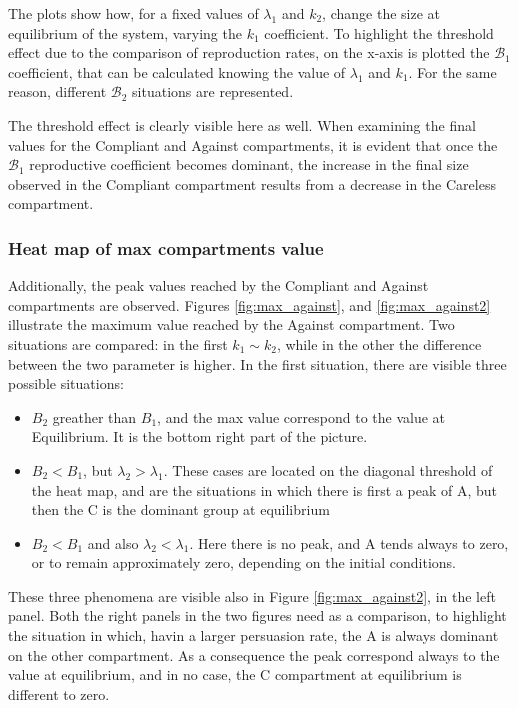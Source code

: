 The plots show how, for a fixed values of $\lambda_1$ and $k_2$, change the size at equilibrium of the system, varying the $k_1$ coefficient. To highlight the threshold effect due to the comparison of reproduction rates, on the x-axis is plotted the $\mathcal{B}_1$  coefficient, that can be calculated knowing the value of  $\lambda_1$ and $k_1$. For the same reason, different $\mathcal{B}_2$ situations are represented. 

The threshold effect is clearly visible here as well. When examining the final values for the Compliant and Against compartments, it is evident that once the $\mathcal{B}_1$ reproductive coefficient becomes dominant, the increase in the final size observed in the Compliant compartment results from a decrease in the Careless compartment.

\subsubsection{Heat map of max compartments value}
Additionally, the peak values reached by the Compliant and Against compartments are observed. Figures \ref{fig:max_against}, and \ref{fig:max_against2} illustrate the maximum value reached by the Against compartment.
Two situations are compared: in the first $k_1 \sim k_2$, while in the other the difference between the two parameter is higher. In the first situation, there are visible three possible situations:
\begin{itemize}
	\item $B_2 $ greather than $B_1$, and the max value correspond to the value at Equilibrium. It is the bottom right part of the picture.
	\item $B_2 < B_1$, but $\lambda_2 > \lambda_1$. These cases are located on the diagonal threshold of the heat map, and are the situations in which there is first a peak of A, but then the C is the dominant group at equilibrium
	\item $B_2 < B_1$ and also $\lambda_2 < \lambda_1$. Here there is no peak, and A tends always to zero, or to remain approximately zero, depending on the initial conditions.
\end{itemize}
These three phenomena are visible also in Figure \ref{fig:max_against2}, in the left panel. Both the right panels in the two figures need as a comparison, to highlight the situation in which, havin a larger persuasion rate, the A is always dominant on the other compartment. As a consequence the peak correspond always to the value at equilibrium, and in no case, the C compartment at equilibrium is different to zero. 
